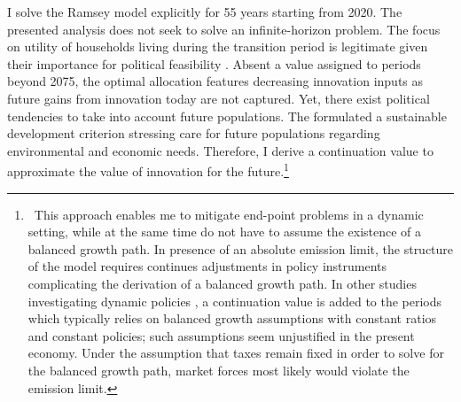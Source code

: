 I solve the Ramsey model explicitly for 55 years starting from 2020. The presented analysis does not seek to solve an infinite-horizon problem. The focus on utility of households living during the transition period is legitimate given their importance for political feasibility
\citep[compare][]{Fried2018TheGenerations}.
Absent a value assigned to periods beyond 2075, the optimal allocation features decreasing innovation inputs as future gains from innovation today are not captured.
Yet, there exist political tendencies to take into account future populations. The \cite{UNSUS} formulated a sustainable development criterion stressing care for future populations regarding environmental and economic needs. 
Therefore, I derive a continuation value to approximate the value of innovation for the future.\footnote{\ This approach enables me to mitigate end-point problems in a dynamic setting, while at the same time do not have to assume the existence of a balanced growth path. In presence of an absolute emission limit, the structure of the model requires continues adjustments in policy instruments complicating the derivation of a balanced growth path.
 In other studies investigating dynamic policies \citep{Jones1993OptimalGrowth, Barrage2019OptimalPolicy}, %
a continuation value is added to the periods which typically relies on balanced growth assumptions with constant ratios and constant policies; such assumptions seem unjustified  in the present economy.
Under the assumption that taxes remain fixed in order to solve for the balanced growth path, market forces most likely would violate the emission limit. }

 

